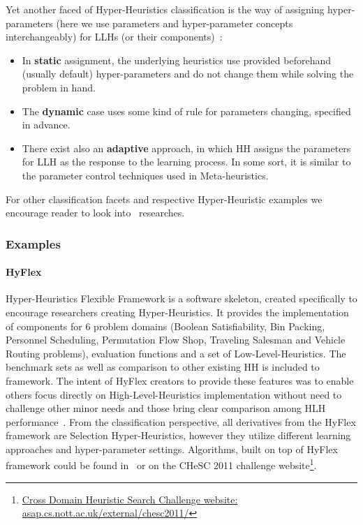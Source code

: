 Yet another faced of Hyper-Heuristics classification is the way of assigning hyper-parameters (here we use parameters and hyper-parameter concepts interchangeably) for LLHs (or their components)~\cite{drake2019recent}:
\begin{itemize}
	\item In \textbf{static} assignment, the underlying heuristics use provided beforehand (usually default) hyper-parameters and do not change them while solving the problem in hand.

	\item The \textbf{dynamic} case uses some kind of rule for parameters changing, specified in advance.

	\item There exist also an \textbf{adaptive} approach, in which HH assigns the parameters for LLH as the response to the learning process. In some sort, it is similar to the parameter control techniques used in Meta-heuristics.
\end{itemize}


For other classification facets and respective Hyper-Heuristic examples we encourage reader to look into~\cite{burke2003hyper,ryser2014review,drake2019recent,burke2019classification,kerschke2019automated} researches.

\subsubsection{Examples}\label{bg: hh examples}%
\paragraph{HyFlex~\cite{ochoa2012hyflex}} Hyper-Heuristics Flexible Framework is a software skeleton, created specifically to encourage researchers creating Hyper-Heuristics. It provides the implementation of components for 6 problem domains (Boolean Satisfiability, Bin Packing, Personnel Scheduling, Permutation Flow Shop, Traveling Salesman and Vehicle Routing problems), evaluation functions and a set of Low-Level-Heuristics. The benchmark sets as well as comparison to other existing HH is included to framework. The intent of HyFlex creators to provide these features was to enable others focus directly on High-Level-Heuristics implementation without need to challenge other minor needs and those bring clear comparison among HLH performance~\cite{ochoa2012hyflex}. From the classification perspective, all derivatives from the HyFlex framework are Selection Hyper-Heuristics, however they utilize different learning approaches and hyper-parameter settings. Algorithms, built on top of HyFlex framework could be found in~\cite{misir2012intelligent,ryser2014review,drake2019recent} or on the CHeSC 2011 challenge website\footnote{\href{http://www.asap.cs.nott.ac.uk/external/chesc2011/}{Cross Domain Heuristic Search Challenge website: asap.cs.nott.ac.uk/external/chesc2011/}}.





